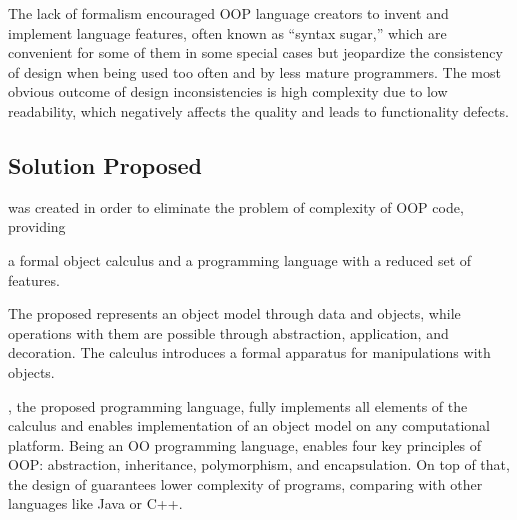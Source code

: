 The lack of formalism encouraged OOP language creators to
invent and implement language features, often known as ``syntax sugar,''
which are convenient for some of them in some special cases but
jeopardize the consistency of design when being used too often
and by less mature programmers. The most obvious
outcome of design inconsistencies is high complexity due to low readability,
which negatively affects the quality and leads to functionality defects.

\subsection{Solution Proposed}

\eo{} was created in order to eliminate the problem of complexity of
OOP code, providing
\begin{inparaenum}[1)]
  a formal object calculus and
  a programming language with a reduced set of features.
\end{inparaenum}
The proposed \phic{} represents an object model through
data and objects, while operations with them are possible
through abstraction, application, and decoration. The calculus
introduces a formal apparatus for manipulations with objects.

\eo{}, the proposed programming language, fully implements
all elements of the calculus and enables implementation of
an object model on any computational platform.
Being an OO programming language, \eo{} enables four key principles of OOP:
abstraction, inheritance, polymorphism, and encapsulation. On top of that,
the design of \eo{} guarantees lower complexity of programs,
comparing with other languages like Java or C++.

